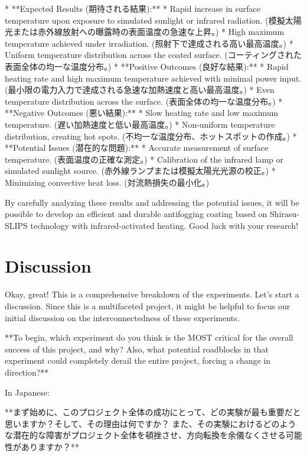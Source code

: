\documentclass{article}
\begin{document}
*   **Expected Results (期待される結果):**
    *   Rapid increase in surface temperature upon exposure to simulated sunlight or infrared radiation. (模擬太陽光または赤外線放射への曝露時の表面温度の急速な上昇。)
    *   High maximum temperature achieved under irradiation. (照射下で達成される高い最高温度。)
    *   Uniform temperature distribution across the coated surface. (コーティングされた表面全体の均一な温度分布。)
*   **Positive Outcomes (良好な結果):**
    *   Rapid heating rate and high maximum temperature achieved with minimal power input. (最小限の電力入力で達成される急速な加熱速度と高い最高温度。)
    *   Even temperature distribution across the surface. (表面全体の均一な温度分布。)
*   **Negative Outcomes (悪い結果):**
    *   Slow heating rate and low maximum temperature. (遅い加熱速度と低い最高温度。)
    *   Non-uniform temperature distribution, creating hot spots. (不均一な温度分布、ホットスポットの作成。)
*   **Potential Issues (潜在的な問題):**
    *   Accurate measurement of surface temperature. (表面温度の正確な測定。)
    *   Calibration of the infrared lamp or simulated sunlight source. (赤外線ランプまたは模擬太陽光光源の校正。)
    *   Minimizing convective heat loss. (対流熱損失の最小化。)

By carefully analyzing these results and addressing the potential issues, it will be possible to develop an efficient and durable antifogging coating based on Shirasu-SLIPS technology with infrared-activated heating. Good luck with your research!


\section{Discussion}
Okay, great! This is a comprehensive breakdown of the experiments. Let's start a discussion.  Since this is a multifaceted project, it might be helpful to focus our initial discussion on the interconnectedness of these experiments.

**To begin, which experiment do you think is the MOST critical for the overall success of this project, and why?  Also, what potential roadblocks in that experiment could completely derail the entire project, forcing a change in direction?**

In Japanese:

**まず始めに、このプロジェクト全体の成功にとって、どの実験が最も重要だと思いますか？そして、その理由は何ですか？ また、その実験におけるどのような潜在的な障害がプロジェクト全体を頓挫させ、方向転換を余儀なくさせる可能性がありますか？**
\end{document}
